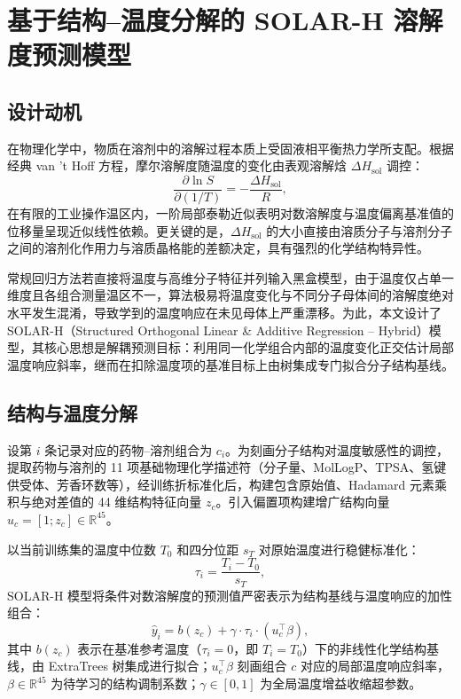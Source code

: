 \section{基于结构--温度分解的 SOLAR-H 溶解度预测模型}\label{sec:solar-method}

\subsection{设计动机}

在物理化学中，物质在溶剂中的溶解过程本质上受固液相平衡热力学所支配。根据经典 van 't Hoff 方程，摩尔溶解度随温度的变化由表观溶解焓 $\Delta H_{\mathrm{sol}}$ 调控：
\begin{equation}
\frac{\partial \ln S}{\partial (1/T)} = -\frac{\Delta H_{\mathrm{sol}}}{R},
\end{equation}
在有限的工业操作温区内，一阶局部泰勒近似表明对数溶解度与温度偏离基准值的位移量呈现近似线性依赖。更关键的是，$\Delta H_{\mathrm{sol}}$ 的大小直接由溶质分子与溶剂分子之间的溶剂化作用力与溶质晶格能的差额决定，具有强烈的化学结构特异性。

常规回归方法若直接将温度与高维分子特征并列输入黑盒模型，由于温度仅占单一维度且各组合测量温区不一，算法极易将温度变化与不同分子母体间的溶解度绝对水平发生混淆，导致学到的温度响应在未见母体上严重漂移。为此，本文设计了 SOLAR-H（Structured Orthogonal Linear \& Additive Regression -- Hybrid）模型，其核心思想是解耦预测目标：利用同一化学组合内部的温度变化正交估计局部温度响应斜率，继而在扣除温度项的基准目标上由树集成专门拟合分子结构基线。

\subsection{结构与温度分解}

设第 $i$ 条记录对应的药物--溶剂组合为 $c_i$。为刻画分子结构对温度敏感性的调控，提取药物与溶剂的 11 项基础物理化学描述符（分子量、MolLogP、TPSA、氢键供受体、芳香环数等），经训练折标准化后，构建包含原始值、Hadamard 元素乘积与绝对差值的 44 维结构特征向量 $z_c$。引入偏置项构建增广结构向量 $u_c = [1; z_c] \in \mathbb{R}^{45}$。

以当前训练集的温度中位数 $T_0$ 和四分位距 $s_T$ 对原始温度进行稳健标准化：
\begin{equation}
\tau_i = \frac{T_i - T_0}{s_T},
\end{equation}
SOLAR-H 模型将条件对数溶解度的预测值严密表示为结构基线与温度响应的加性组合：
\begin{equation}\label{eq:v2-solar}
\widehat y_i = b(z_c) + \gamma \cdot \tau_i \cdot \left( u_c^\top \beta \right),
\end{equation}
其中 $b(z_c)$ 表示在基准参考温度（$\tau_i = 0$，即 $T_i = T_0$）下的非线性化学结构基线，由 ExtraTrees 树集成进行拟合；$u_c^\top \beta$ 刻画组合 $c$ 对应的局部温度响应斜率，$\beta \in \mathbb{R}^{45}$ 为待学习的结构调制系数；$\gamma \in [0, 1]$ 为全局温度增益收缩超参数。

